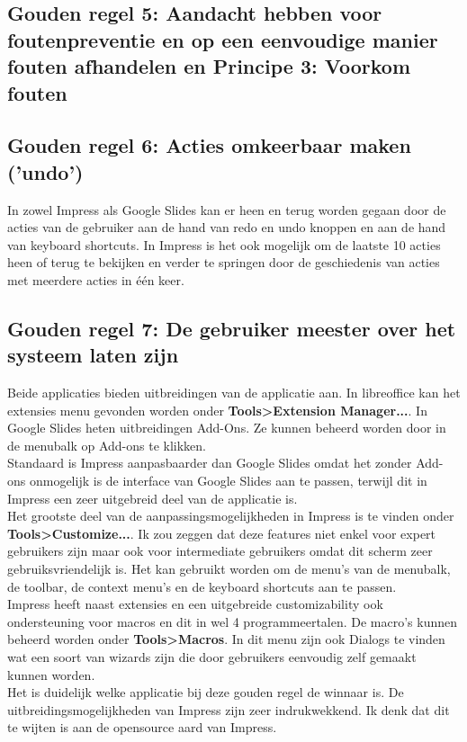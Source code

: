 \documentclass[a4paper]{article}
\begin{document}
\subsection{Gouden regel 5: Aandacht hebben voor foutenpreventie en op een eenvoudige manier fouten afhandelen en Principe 3: Voorkom fouten}
\subsection{Gouden regel 6: Acties omkeerbaar maken ('undo')}
In zowel Impress als Google Slides kan er heen en terug worden gegaan door de acties van de gebruiker aan de hand van redo en undo knoppen en aan de hand van keyboard shortcuts.
In Impress is het ook mogelijk om de laatste 10 acties heen of terug te bekijken en verder te springen door de geschiedenis van acties met meerdere acties in \'e\'en keer.
\subsection{Gouden regel 7: De gebruiker meester over het systeem laten zijn}
Beide applicaties bieden uitbreidingen van de applicatie aan. In libreoffice kan het extensies menu gevonden worden onder \textbf{Tools\textgreater Extension Manager...}. In Google Slides heten uitbreidingen Add-Ons. Ze kunnen beheerd worden door in de menubalk op Add-ons te klikken.\\
Standaard is Impress aanpasbaarder dan Google Slides omdat het zonder Add-ons onmogelijk is de interface van Google Slides aan te passen, terwijl dit in Impress een zeer uitgebreid deel van de applicatie is.\\
Het grootste deel van de aanpassingsmogelijkheden in Impress is te vinden onder \textbf{Tools\textgreater Customize...}. Ik zou zeggen dat deze features niet enkel voor expert gebruikers zijn maar ook voor intermediate gebruikers omdat dit scherm zeer gebruiksvriendelijk is. Het kan gebruikt worden om de menu's van de menubalk, de toolbar, de context menu's en de keyboard shortcuts aan te passen.\\
Impress heeft naast extensies en een uitgebreide customizability ook ondersteuning voor macros en dit in wel 4 programmeertalen. De macro's kunnen beheerd worden onder \textbf{Tools\textgreater Macros}. In dit menu zijn ook Dialogs te vinden wat een soort van wizards zijn die door gebruikers eenvoudig zelf gemaakt kunnen worden.\\
Het is duidelijk welke applicatie bij deze gouden regel de winnaar is. De uitbreidingsmogelijkheden van Impress zijn zeer indrukwekkend. Ik denk dat dit te wijten is aan de opensource aard van Impress. 
\end{document}
